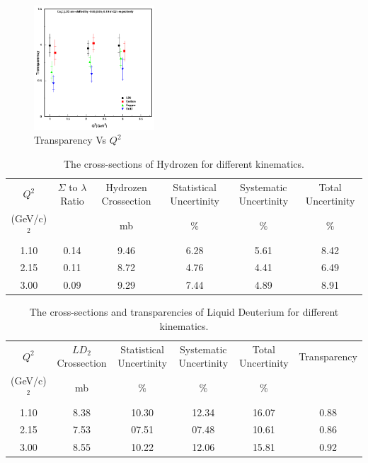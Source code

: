 \documentclass[aps,11pt]{revtex4}
\begin{document}
\begin{figure}[h]
	\centering
		\includegraphics[width=0.40\textwidth]{transp.png}
	\caption{Transparency Vs $Q^2$}
	\label{fig:transp}
\end{figure}

\begin{table}[!ht] 
\begin{tabular}{||c|c|c|c|c|c||}\hline
 $Q^2$ & $\Sigma$ to $\lambda$ Ratio & Hydrozen Crossection & Statistical Uncertinity & Systematic Uncertinity & Total Uncertinity \\
 (GeV/c)$^2$ & & mb & $\%$ & $\%$ & $\%$ \\\hline
1.10 &0.14 &9.46 &6.28 &5.61 &8.42 \\
2.15 &0.11 &8.72 &4.76 &4.41 &6.49 \\
3.00 &0.09 &9.29 &7.44 &4.89 &8.91 \\\hline      
\end{tabular}
\caption{\label{table1} The cross-sections of Hydrozen for different kinematics.}\label{tab:h}
\vspace{-0.5cm}
\end{table}

\begin{table}[!ht] 
\begin{tabular}{||c|c|c|c|c|c||}\hline
 $Q^2$ & $LD_2$ Crossection & Statistical Uncertinity & Systematic Uncertinity & Total Uncertinity & Transparency \\
 (GeV/c)$^2$ & mb & $\%$ & $\%$ & $\%$ &  \\\hline
1.10 &8.38 &10.30 &12.34 &16.07 &0.88 \\
2.15 &7.53 &07.51 &07.48 &10.61 &0.86  \\
3.00 &8.55 &10.22 &12.06 &15.81 &0.92 \\\hline      
\end{tabular}
\caption{\label{table1} The cross-sections and transparencies of Liquid Deuterium for different kinematics.}\label{tab:ld}
\vspace{-0.5cm}
\end{table}
\end{document}
